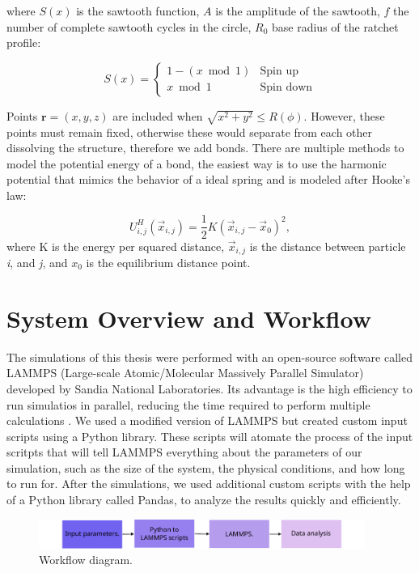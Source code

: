 where $S(x)$ is the sawtooth function, $A$ is the amplitude of the sawtooth, $f$ the number of complete sawtooth cycles in the circle, $R_0$ base radius of the ratchet profile:

\begin{equation}
S(x) = \begin{cases}
1 - (x \bmod 1) & \text{Spin up} \\
x \bmod 1 & \text{Spin down}
\end{cases}
\end{equation}

Points $\mathbf{r} = (x, y, z)$ are included when $\sqrt{x^2 + y^2} \leq R(\phi)$.
However, these points must remain fixed, otherwise these would separate from each other dissolving the structure, therefore we add bonds.
There are multiple methods to model the potential energy of a bond, the easiest way is to use the harmonic potential that mimics the behavior of a ideal spring and is modeled after Hooke's law:

\begin{equation}
  U^{H}_{i,j}(\vec{x}_{i,j}) = \frac{1}{2}K(\vec{x}_{i,j} - \vec{x}_0)^2,
\end{equation}
where K is the energy per squared distance, $\vec{x}_{i,j}$ is the distance between particle \textit{i}, and \textit{j}, and $x_0$ is the equilibrium distance point.

\section{System Overview and Workflow}

The simulations of this thesis were performed with an open-source software called LAMMPS (Large-scale Atomic/Molecular Massively Parallel Simulator) developed by Sandia National Laboratories. Its advantage is the high efficiency to run simulatios in parallel, reducing the time required to perform multiple calculations \cite{LAMMPS}. We used a modified version of LAMMPS but created custom input scripts using a Python library. These scripts will atomate the process of the input scritpts that will tell LAMMPS everything about the parameters of our simulation, such as the size of the system, the physical conditions, and how long to run for. After the simulations, we used additional custom scripts with the help of a Python library called Pandas, to analyze the results quickly and efficiently.

\begin{figure}[h]
  \begin{center}
    \includegraphics[width=0.95\textwidth]{figures/workflow.pdf}
  \end{center}
  \caption[Workflow diagram.]{Workflow diagram.}\label{fig:workflow}
\end{figure}

